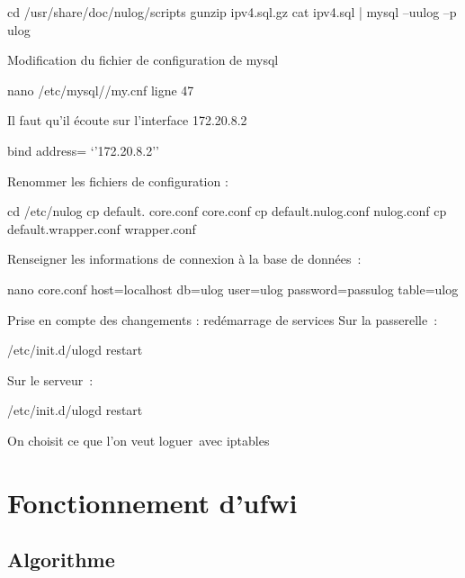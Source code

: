 \documentclass[12pt]{report}
\begin{document}
\begin{itemize}
cd /usr/share/doc/nulog/scripts
gunzip ipv4.sql.gz
cat ipv4.sql | mysql –uulog –p ulog

Modification du fichier de configuration de mysql

nano /etc/mysql//my.cnf
ligne 47

Il faut qu’il écoute sur l’interface 172.20.8.2

bind address= ‘’172.20.8.2’’

Renommer les fichiers de configuration :

cd /etc/nulog
cp default. core.conf core.conf
cp default.nulog.conf nulog.conf
cp default.wrapper.conf wrapper.conf

Renseigner les informations de connexion à la base de données :

nano core.conf
host=localhost
db=ulog
user=ulog
password=passulog
table=ulog

Prise en compte des changements : redémarrage de services
Sur la passerelle :

/etc/init.d/ulogd restart

Sur le serveur :

/etc/init.d/ulogd restart


On choisit ce que l’on veut loguer avec iptables

\chapter{Fonctionnement d'ufwi}
\section{Algorithme}


\end{itemize}
\end{document}

